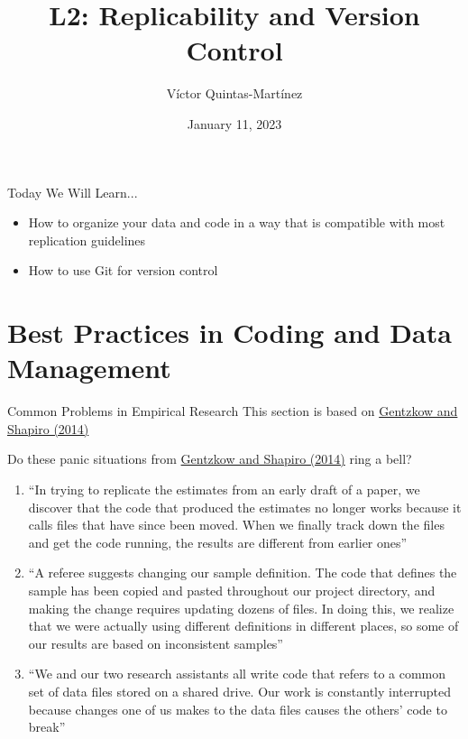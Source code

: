 \documentclass[10pt, aspectratio=169, xcolor=dvipsnames]{beamer}
\title{L2: Replicability and Version Control}
\author{Víctor Quintas-Martínez}
\institute{MIT}
\date{January 11, 2023}
\let\olditem\item
\renewcommand{\item}{%
\olditem\vspace{0.3em}}
\begin{document}
\begin{frame}
\maketitle
\end{frame}

\begin{frame}{Today We Will Learn...}
\begin{itemize}
    \item How to organize your data and code in a way that is compatible with most replication guidelines
    \item How to use Git for version control
\end{itemize}
\end{frame}

\section{Best Practices in Coding and Data Management}
\begin{frame}[t]{Common Problems in Empirical Research}
    \footnotesize This section is based on \href{https://web.stanford.edu/~gentzkow/research/CodeAndData.pdf}{Gentzkow and Shapiro (2014)}

    \normalsize\vspace{0.5em} Do these panic situations from \href{https://web.stanford.edu/~gentzkow/research/CodeAndData.pdf}{Gentzkow and Shapiro (2014)} ring a bell? 
    \begin{enumerate}
        \item ``In trying to replicate the estimates from an early draft of a paper, we discover that the code that produced the estimates no longer works because it calls files that have since been moved. When we finally track down the files and get the code running, the results are different from  earlier ones''
        \item ``A referee suggests changing our sample definition. The code that defines the sample has been copied and pasted throughout our project directory, and making the change requires updating dozens of files. In doing this, we realize that we were actually using different definitions in different places, so some of our results are based on inconsistent samples''
        \item ``We and our two research assistants all write code that refers to a common set of data files stored on a shared drive. Our work is constantly interrupted because changes one of us makes to the data files causes the others' code to break''
    \end{enumerate}
\end{frame}
\end{document}
